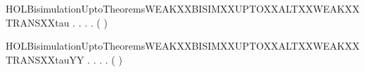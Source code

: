 \newcommand{\HOLBisimulationUptoTheoremsWEAKXXBISIMXXUPTOXXALTXXWEAKXXTRANSXXlabelYY}{\UseVerbatim{HOLBisimulationUptoTheoremsWEAKXXBISIMXXUPTOXXALTXXWEAKXXTRANSXXlabelYY}}
\begin{SaveVerbatim}{HOLBisimulationUptoTheoremsWEAKXXBISIMXXUPTOXXALTXXWEAKXXTRANSXXtau}
\HOLTokenTurnstile{} \HOLSymConst{\HOLTokenForall{}}.
         \HOLSymConst{\HOLTokenImp{}}
       \HOLSymConst{\HOLTokenForall{}} .
              \HOLSymConst{\HOLTokenImp{}}
           \HOLSymConst{\HOLTokenForall{}}.
                \HOLTokenWeakTransBegin\HOLConst{\ensuremath{\tau}}\HOLTokenWeakTransEnd {} \HOLSymConst{\HOLTokenImp{}}
               \HOLSymConst{\HOLTokenExists{}}.
                      \HOLSymConst{\HOLTokenConj{}}
                   (    )  
\end{SaveVerbatim}
\newcommand{\HOLBisimulationUptoTheoremsWEAKXXBISIMXXUPTOXXALTXXWEAKXXTRANSXXtau}{\UseVerbatim{HOLBisimulationUptoTheoremsWEAKXXBISIMXXUPTOXXALTXXWEAKXXTRANSXXtau}}
\begin{SaveVerbatim}{HOLBisimulationUptoTheoremsWEAKXXBISIMXXUPTOXXALTXXWEAKXXTRANSXXtauYY}
\HOLTokenTurnstile{} \HOLSymConst{\HOLTokenForall{}}.
         \HOLSymConst{\HOLTokenImp{}}
       \HOLSymConst{\HOLTokenForall{}} .
              \HOLSymConst{\HOLTokenImp{}}
           \HOLSymConst{\HOLTokenForall{}}.
                \HOLTokenWeakTransBegin\HOLConst{\ensuremath{\tau}}\HOLTokenWeakTransEnd {} \HOLSymConst{\HOLTokenImp{}}
               \HOLSymConst{\HOLTokenExists{}}.
                      \HOLSymConst{\HOLTokenConj{}}
                   (    )  
\end{SaveVerbatim}
